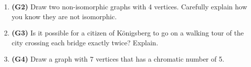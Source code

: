 \documentclass[12pt]{article}
\begin{document}
\begin{enumerate}
\item \textbf{(G2)} Draw two non-isomorphic graphs with 4 vertices. Carefully explain how you know they are not isomorphic.

\item \textbf{(G3)} Is it possible for a citizen of  K\"{o}nigsberg to go on a walking tour of the city crossing each bridge exactly twice? Explain.

\item \textbf{(G4)} Draw a graph with 7 vertices that has a chromatic number of 5.

\end{enumerate}
\end{document}
